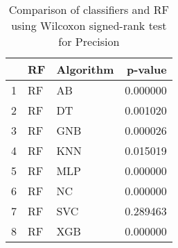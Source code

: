 \begin{table}
\footnotesize
\caption{Comparison of classifiers and RF using Wilcoxon signed-rank test for Precision}
\label{tab:RF wilcoxon Precision comparison}
\begin{tabular}{lllr}
\hline
 & RF & Algorithm & p-value \\
\hline
1 & RF & AB & 0.000000 \\
2 & RF & DT & 0.001020 \\
3 & RF & GNB & 0.000026 \\
4 & RF & KNN & 0.015019 \\
5 & RF & MLP & 0.000000 \\
6 & RF & NC & 0.000000 \\
7 & RF & SVC & 0.289463 \\
8 & RF & XGB & 0.000000 \\
\hline
\end{tabular}
\end{table}
